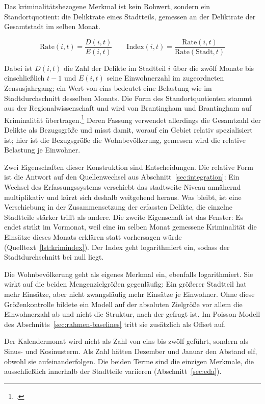 Das kriminalitätsbezogene Merkmal ist kein Rohwert, sondern ein
Standortquotient: die Deliktrate eines Stadtteils, gemessen an der Deliktrate
der Gesamtstadt im selben Monat.

\begin{equation*}
    \mathrm{Rate}(i,t) = \frac{D(i,t)}{E(i,t)}
    \qquad
    \mathrm{Index}(i,t) = \frac{\mathrm{Rate}(i,t)}{\mathrm{Rate}(\mathrm{Stadt},t)}
\end{equation*}

Dabei ist $D(i,t)$ die Zahl der Delikte im Stadtteil $i$ über die zwölf Monate
bis einschließlich $t-1$ und $E(i,t)$ seine Einwohnerzahl im zugeordneten
Zensusjahrgang; ein Wert von eins bedeutet eine Belastung wie im
Stadtdurchschnitt desselben Monats. Die Form des Standortquotienten stammt aus
der Regionalwissenschaft und wird von Brantingham und Brantingham auf
Kriminalität übertragen.\footcite[268-269]{Brantingham1997} Deren Fassung
verwendet allerdings die Gesamtzahl der Delikte als Bezugsgröße und misst
damit, worauf ein Gebiet relativ spezialisiert ist; hier ist die Bezugsgröße
die Wohnbevölkerung, gemessen wird die relative Belastung je Einwohner.

Zwei Eigenschaften dieser Konstruktion sind Entscheidungen. Die relative Form
ist die Antwort auf den Quellenwechsel aus Abschnitt~\ref{sec:integration}: Ein
Wechsel des Erfassungssystems verschiebt das stadtweite Niveau annähernd
multiplikativ und kürzt sich deshalb weitgehend heraus. Was bleibt, ist eine
Verschiebung in der Zusammensetzung der erfassten Delikte, die einzelne
Stadtteile stärker trifft als andere. Die zweite Eigenschaft ist das Fenster:
Es endet strikt im Vormonat, weil eine im selben Monat gemessene Kriminalität
die Einsätze dieses Monats erklären statt vorhersagen würde
(Quelltext~\ref{lst:krimindex}). Der Index geht logarithmiert ein, sodass der
Stadtdurchschnitt bei null liegt.

Die Wohnbevölkerung geht als eigenes Merkmal ein, ebenfalls logarithmiert. Sie
wirkt auf die beiden Mengenzielgrößen gegenläufig: Ein größerer Stadtteil hat
mehr Einsätze, aber nicht zwangsläufig mehr Einsätze je Einwohner. Ohne diese
Größenkontrolle bildete ein Modell auf der absoluten Zielgröße vor allem die
Einwohnerzahl ab und nicht die Struktur, nach der gefragt ist. Im
Poisson-Modell des Abschnitts~\ref{sec:rahmen-baselines} tritt sie zusätzlich
als Offset auf.

Der Kalendermonat wird nicht als Zahl von eins bis zwölf geführt, sondern als
Sinus- und Kosinusterm. Als Zahl hätten Dezember und Januar den Abstand elf,
obwohl sie aufeinanderfolgen. Die beiden Terme sind die einzigen Merkmale, die
ausschließlich innerhalb der Stadtteile variieren (Abschnitt~\ref{sec:eda}).

